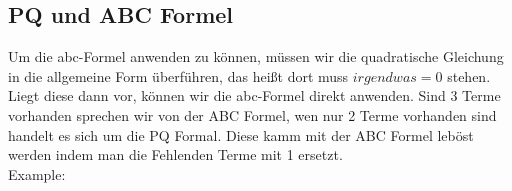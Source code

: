 \newpage
\subsection{PQ und ABC Formel}


Um die abc-Formel anwenden zu können, müssen wir die quadratische Gleichung in die allgemeine Form überführen, das heißt dort muss $irgendwas = 0$ stehen. Liegt diese dann vor, können wir die abc-Formel direkt anwenden.
Sind 3 Terme vorhanden sprechen wir von der ABC Formel, wen nur 2 Terme vorhanden sind handelt es sich um die PQ Formal.
Diese kamm mit der ABC Formel leböst werden indem man die Fehlenden Terme mit 1 ersetzt.\\

\hfill \break
Example:\\
\fboxrule=0.8pt 

